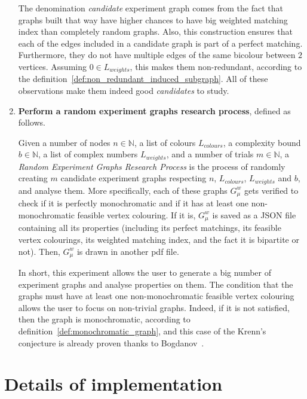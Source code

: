 \begin{enumerate}
    The denomination \textit{candidate} experiment graph comes from the fact that graphs built that way have higher chances to have big weighted matching index than completely random graphs.
    Also, this construction ensures that each of the edges included in a candidate graph is part of a perfect matching.
    Furthermore, they do not have multiple edges of the same bicolour between $2$ vertices.
    Assuming $0 \in L_{weights}$, this makes them non-redundant, according to the definition~\ref{def:non_redundant_induced_subgraph}.
    All of these observations make them indeed good \textit{candidates} to study.

    \item \textbf{Perform a random experiment graphs research process}, defined as follows.
        \begin{definition}
            \label{def:random_experiment_graphs_research_process}
            Given a number of nodes $n \in \mathbb{N}$, a list of colours $L_{colours}$, a complexity bound $b \in \mathbb{N}$, a list of complex numbers $L_{weights}$, and a number of trials $m \in \mathbb{N}$, a \textit{Random Experiment Graphs Research Process} is the process of randomly creating $m$ candidate experiment graphs respecting $n$, $L_{colours}$, $L_{weights}$ and $b$, and analyse them.
            More specifically, each of these graphs $G_\mu^w$ gets verified to check if it is perfectly monochromatic and if it has at least one non-monochromatic feasible vertex colouring.
            If it is, $G_\mu^w$ is saved as a JSON file containing all its properties (including its perfect matchings, its feasible vertex colourings, its weighted matching index, and the fact it is bipartite or not).
            Then, $G_\mu^w$ is drawn in another pdf file.
        \end{definition}

        In short, this experiment allows the user to generate a big number of experiment graphs and analyse properties on them.
        The condition that the graphs must have at least one non-monochromatic feasible vertex colouring allows the user to focus on non-trivial graphs.
        Indeed, if it is not satisfied, then the graph is monochromatic, according to definition~\ref{def:monochromatic_graph}, and this case of the Krenn's conjecture is already proven thanks to Bogdanov~\cite{bogdanov}.

\end{enumerate}


\section{Details of implementation}
\label{sec:details-of-implementation}

